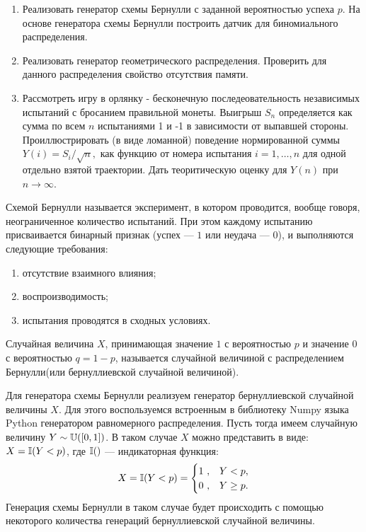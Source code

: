 

\begin{enumerate}
	\item Реализовать генератор схемы Бернулли с заданной вероятностью
     успеха $p$. На основе генератора схемы Бернулли построить датчик
     для биномиального распределения.
	\item Реализовать генератор геометрического распределения. Проверить
     для данного распределения свойство отсутствия памяти.
	\item Рассмотреть игру в орлянку - бесконечную последеовательность
     независимых испытаний с бросанием правильной монеты.
     Выигрыш $S_n$ определяется как сумма по всем $n$ испытаниями 1 и -1
     в зависимости от выпавшей стороны. Проиллюстрировать (в виде ломанной)
     поведение нормированной суммы $Y(i) = S_i / \sqrt{n},$ как функцию
     от номера испытания $i = 1, \dots, n$ для одной отдельно взятой
     траектории. Дать теоритическую оценку для $Y(n)$
     при $n \longrightarrow \infty$.
\end{enumerate}

\begin{definition}
	Схемой Бернулли называется эксперимент, в котором проводится,
     вообще говоря, неограниченное количество испытаний. При этом каждому
     испытанию присваивается бинарный признак (успех --- $1$ или неудача --- $0$), и
     выполняются следующие требования:
	\begin{enumerate}
		\item отсутствие взаимного влияния;
		\item воспроизводимость;
		\item испытания проводятся в сходных условиях.
	\end{enumerate}
\end{definition}

\begin{definition}
	Случайная величина $X$, принимающая значение $1$ с вероятностью
     $p$ и значение $0$ с вероятностью $q = 1 - p$, называется случайной величиной
     с распределением Бернулли(или бернуллиевской случайной величиной).
\end{definition}

Для генератора схемы Бернулли реализуем генератор бернуллиевской случайной
 величины $X$. Для этого воспользуемся встроенным в библиотеку Numpy
 языка Python генератором равномерного распределения. Пусть тогда имеем
 случайную величину $Y \sim \operatorname{\mathbb{U}}([0,1])$. В таком случае $X$
 можно представить в виде: $X = \operatorname{\mathbb{I}}(Y < p)$, где $\operatorname{\mathbb{I}}()$
 --- индикаторная функция:
$$
    X = \operatorname{\mathbb{I}}(Y < p) = 
    \begin{cases}
        1 \ , & Y < p, \\
        0 \ , & Y \ge p.
    \end{cases}
$$
Генерация схемы Бернулли в таком случае будет происходить с помощью некоторого
 количества генераций бернуллиевской случайной величины.

